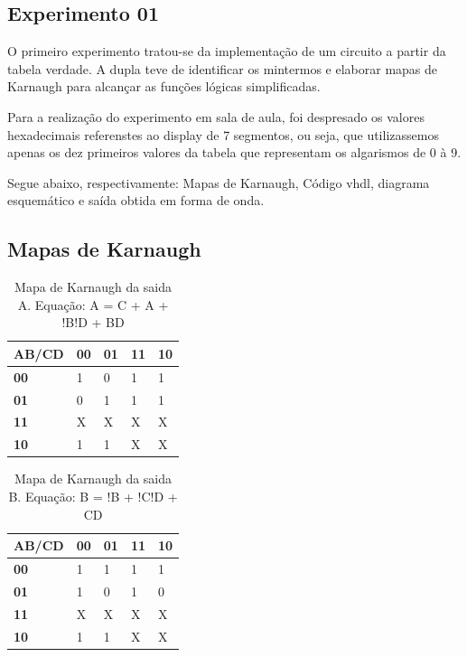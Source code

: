 \documentclass[12pts]{article}
\begin{document}
\subsection{Experimento 01}
\singlespacing

	O primeiro experimento tratou-se da implementação de um circuito a partir da tabela verdade. A dupla teve de identificar os mintermos e elaborar mapas de Karnaugh para alcançar as funções lógicas simplificadas.
	
	Para a realização do experimento em sala de aula, foi despresado os valores hexadecimais referenstes ao display de 7 segmentos, ou seja, que utilizassemos apenas os dez primeiros valores da tabela que representam os algarismos de 0 à 9. 
	
	Segue abaixo, respectivamente: Mapas de Karnaugh, Código vhdl, diagrama esquemático e saída obtida em forma de onda.
\singlespacing

\subsection{Mapas de Karnaugh}

\begin{table}[h]
\begin{center}
	\begin{tabular}{|l|l|l|l|l|}
		\hline
		\textbf{AB/CD} & \textbf{00} & \textbf{01} & \textbf{11} & \textbf{10}\\
		\hline
		\textbf{00} & 1 & 0 & 1 & 1\\
		\hline
		\textbf{01} & 0 & 1 & 1 & 1\\
		\hline
		\textbf{11} & X & X & X & X\\
		\hline
		\textbf{10} & 1 & 1 & X & X\\
		\hline
	\end{tabular}
\end{center}
	\caption{Mapa de Karnaugh da saida A. Equação: A = C + A + !B!D + BD }
	\end{table}
	\singlespacing

\begin{table}[h]
\begin{center}
	\begin{tabular}{|l|l|l|l|l|}
		\hline
		\textbf{AB/CD} & \textbf{00} & \textbf{01} & \textbf{11} & \textbf{10}\\
		\hline
		\textbf{00} & 1 & 1 & 1 & 1\\
		\hline
		\textbf{01} & 1 & 0 & 1 & 0\\
		\hline
		\textbf{11} & X & X & X & X\\
		\hline
		\textbf{10} & 1 & 1 & X & X\\
		\hline
	\end{tabular}
\end{center}
	\caption{Mapa de Karnaugh da saida B. Equação: B = !B + !C!D + CD }
\end{table}
	
\end{document}
